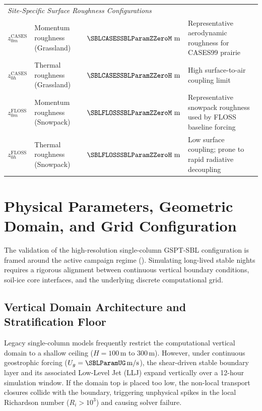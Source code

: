 \documentclass[11pt,letterpaper]{article}
\begin{document}
\begin{table}[htbp]
{\begin{tabular}{p{}p{}p{}p{}}
\midrule
\multicolumn{4}{l}{\textit{Site-Specific Surface Roughness Configurations}} \\
$z_{0m}^{\text{CASES}}$ & Momentum roughness (Grassland) & $\SBLCASESSBLParamZZeroM \ \mathrm{m}$ & Representative aerodynamic roughness for CASES99 prairie \\
$z_{0h}^{\text{CASES}}$ & Thermal roughness (Grassland) & $\SBLCASESSBLParamZZeroH \ \mathrm{m}$ & High surface-to-air coupling limit \\
$z_{0m}^{\text{FLOSS}}$ & Momentum roughness (Snowpack) & $\SBLFLOSSSBLParamZZeroM \ \mathrm{m}$ & Representative snowpack roughness used by FLOSS baseline forcing \\
$z_{0h}^{\text{FLOSS}}$ & Thermal roughness (Snowpack) & $\SBLFLOSSSBLParamZZeroH \ \mathrm{m}$ & Low surface coupling; prone to rapid radiative decoupling \\
\bottomrule
\end{tabular}
}
\end{table}

\section{Physical Parameters, Geometric Domain, and Grid Configuration}
\label{sec:parameters_geometry}

The validation of the high-resolution single-column GSPT-SBL configuration is framed around the active campaign regime (\ActiveDataset). Simulating long-lived stable nights requires a rigorous alignment between continuous vertical boundary conditions, soil-ice core interfaces, and the underlying discrete computational grid.

\subsection{Vertical Domain Architecture and Stratification Floor}
\label{subsec:domain_stratification}

Legacy single-column models frequently restrict the computational vertical domain to a shallow ceiling ($H = 100\,\mathrm{m}$ to $300\,\mathrm{m}$). However, under continuous geostrophic forcing ($U_g = \SBLParamUG\,\mathrm{m/s}$), the shear-driven stable boundary layer and its associated Low-Level Jet (LLJ) expand vertically over a 12-hour simulation window. If the domain top is placed too low, the non-local transport closures collide with the boundary, triggering unphysical spikes in the local Richardson number ($R_i > 10^3$) and causing solver failure.
\end{document}
